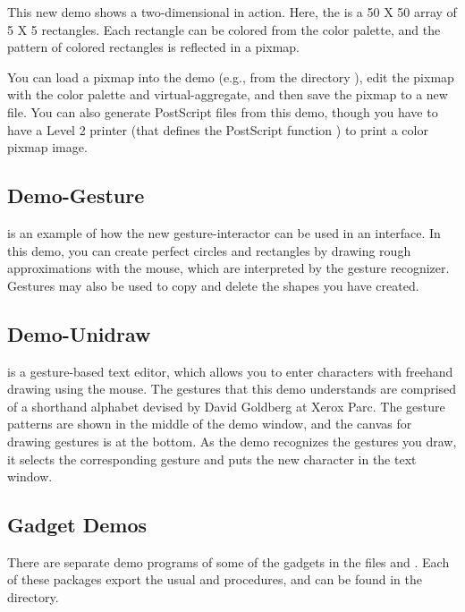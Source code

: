 This new demo shows a two-dimensional  in action.
Here, the  is a 50 X 50 array of 5 X 5 rectangles.
Each rectangle can be colored from the color palette, and the pattern of
colored rectangles is reflected in a pixmap.

You can load a pixmap into the demo (e.g., from the directory
), edit the pixmap with the color palette and
virtual-aggregate, and then save the pixmap to a new file.  You can also
generate PostScript files from this demo, though you have to have a Level 2
printer (that defines the PostScript function ) to print
a color pixmap image.



\subsection{Demo-Gesture}
 is an example of how the new gesture-interactor can be used
in an interface.  In this demo, you can create perfect circles and
rectangles by drawing rough approximations with the mouse, which are
interpreted by the gesture recognizer.  Gestures may also be used to copy
and delete the shapes you have created.

\subsection{Demo-Unidraw}
 is a gesture-based text editor, which allows you to enter
characters with freehand drawing using the mouse.  The gestures that
this demo understands are comprised of a shorthand alphabet devised by
David Goldberg at Xerox Parc.  The gesture patterns are shown in the middle
of the demo window, and the canvas for drawing gestures is at the bottom.
As the demo recognizes the gestures you draw, it selects the corresponding
gesture and puts the new character in the text window.


\subsection{Gadget Demos}
\label{gadgetdemos}

There are separate demo programs of some of the gadgets in the files
 and .  Each of these packages export the
usual  and  procedures, and can be found in the
 directory.

